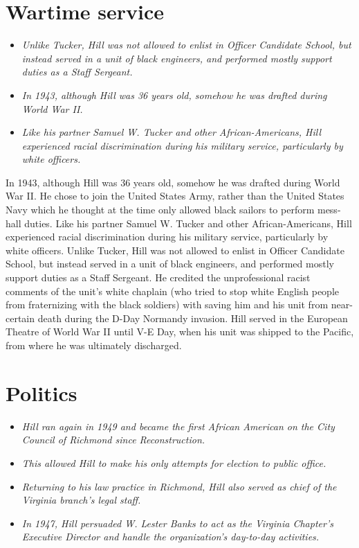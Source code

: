\section{Wartime service}\label{wartime-service}

\begin{itemize}
\item
  \emph{Unlike Tucker, Hill was not allowed to enlist in Officer
  Candidate School, but instead served in a unit of black engineers, and
  performed mostly support duties as a Staff Sergeant.}
\item
  \emph{In 1943, although Hill was 36 years old, somehow he was drafted
  during World War II.}
\item
  \emph{Like his partner Samuel W. Tucker and other African-Americans,
  Hill experienced racial discrimination during his military service,
  particularly by white officers.}
\end{itemize}

In 1943, although Hill was 36 years old, somehow he was drafted during
World War II. He chose to join the United States Army, rather than the
United States Navy which he thought at the time only allowed black
sailors to perform mess-hall duties. Like his partner Samuel W. Tucker
and other African-Americans, Hill experienced racial discrimination
during his military service, particularly by white officers. Unlike
Tucker, Hill was not allowed to enlist in Officer Candidate School, but
instead served in a unit of black engineers, and performed mostly
support duties as a Staff Sergeant. He credited the unprofessional
racist comments of the unit's white chaplain (who tried to stop white
English people from fraternizing with the black soldiers) with saving
him and his unit from near-certain death during the D-Day Normandy
invasion. Hill served in the European Theatre of World War II until V-E
Day, when his unit was shipped to the Pacific, from where he was
ultimately discharged.

\section{Politics}\label{politics}

\begin{itemize}
\item
  \emph{Hill ran again in 1949 and became the first African American on
  the City Council of Richmond since Reconstruction.}
\item
  \emph{This allowed Hill to make his only attempts for election to
  public office.}
\item
  \emph{Returning to his law practice in Richmond, Hill also served as
  chief of the Virginia branch's legal staff.}
\item
  \emph{In 1947, Hill persuaded W. Lester Banks to act as the Virginia
  Chapter's Executive Director and handle the organization's day-to-day
  activities.}
\end{itemize}

